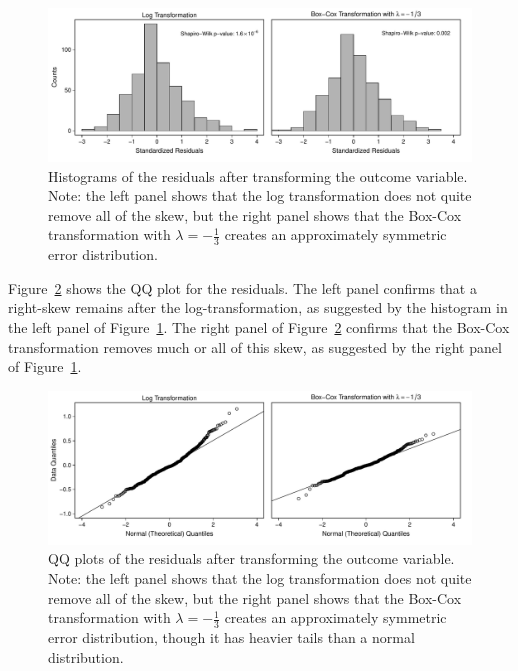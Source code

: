 \documentclass[12pt]{article}
\begin{document}
\begin{figure}[h!]
\begin{center}
\includegraphics[width = \textwidth]{figs/cg-trans-residuals-hist.pdf}
\caption{Histograms of the residuals after transforming the outcome variable. \\
Note: the left panel shows that the log transformation does not quite remove all of the skew, but the right panel shows that the Box-Cox transformation with $\lambda = -\frac{1}{3}$ creates an approximately symmetric error distribution.}\label{fig:cg-trans-residuals-hist}
\end{center}
\end{figure}

Figure~\ref{fig:cg-trans-qq-plot} shows the QQ plot for the residuals. 
The left panel confirms that a right-skew remains after the log-transformation, as suggested by the histogram in the left panel of Figure~\ref{fig:cg-trans-residuals-hist}. 
The right panel of Figure~\ref{fig:cg-trans-qq-plot} confirms that the Box-Cox transformation removes much or all of this skew, as suggested by the right panel of Figure~\ref{fig:cg-trans-residuals-hist}. 

\begin{figure}[h!]
\begin{center}
\includegraphics[width = \textwidth]{figs/cg-trans-qq-plot.pdf}
\caption{QQ plots of the residuals after transforming the outcome variable.\\
Note: the left panel shows that the log transformation does not quite remove all of the skew, but the right panel shows that the Box-Cox transformation with $\lambda = -\frac{1}{3}$ creates an approximately symmetric error distribution, though it has heavier tails than a normal distribution.}\label{fig:cg-trans-qq-plot}
\end{center}
\end{figure}
\end{document}

